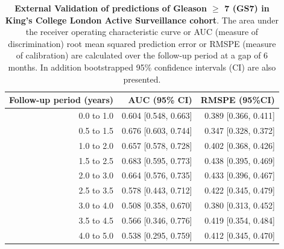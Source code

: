\begin{table}[!htb]
\small\sf\centering
\caption{\textbf{External Validation of predictions of Gleason $\geq$ 7 (GS7) in King's College London Active Surveillance cohort}. The area under the receiver operating characteristic curve or AUC (measure of discrimination) root mean squared prediction error or RMSPE (measure of calibration) are calculated over the follow-up period at a gap of 6 months. In addition bootstrapped 95\% confidence intervals (CI) are also presented.}
\label{tab:AUC_PE_KCL}
\begin{tabular}{r|r|r}
\hline
\hline
Follow-up period (years) & AUC (95\% CI) & RMSPE (95\%CI)\\ 
\hline
0.0 to 1.0 & 0.604 [0.548, 0.663] & 0.389 [0.366, 0.411]\\
0.5 to 1.5 & 0.676 [0.603, 0.744] & 0.347 [0.328, 0.372]\\
1.0 to 2.0 & 0.657 [0.578, 0.728] & 0.402 [0.368, 0.426]\\
1.5 to 2.5 & 0.683 [0.595, 0.773] & 0.438 [0.395, 0.469]\\
2.0 to 3.0 & 0.664 [0.576, 0.735] & 0.433 [0.396, 0.467]\\
2.5 to 3.5 & 0.578 [0.443, 0.712] & 0.422 [0.345, 0.479]\\
3.0 to 4.0 & 0.508 [0.358, 0.670] & 0.380 [0.313, 0.452]\\
3.5 to 4.5 & 0.566 [0.346, 0.776] & 0.419 [0.354, 0.484]\\
4.0 to 5.0 & 0.538 [0.295, 0.759] & 0.412 [0.345, 0.470]\\
\hline
\end{tabular}	
\end{table}

